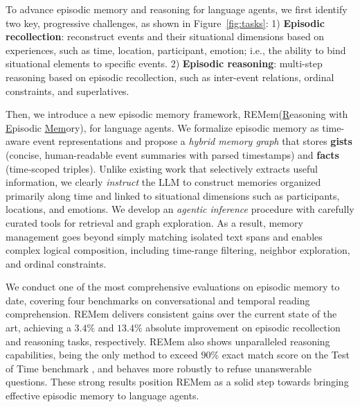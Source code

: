 \documentclass{article} %
\newcommand{\ours}{REMem\xspace}
\begin{document}
To advance episodic memory and reasoning for language agents, we first identify two key, progressive challenges, as shown in Figure~\ref{fig:tasks}:
1) \textbf{Episodic recollection}: reconstruct events and their situational dimensions based on experiences, such as time, location, participant, emotion; i.e., the ability to bind situational elements to specific events.
2) \textbf{Episodic reasoning}: multi-step reasoning based on episodic recollection, such as inter-event relations, ordinal constraints, and superlatives.



Then, we introduce a new episodic memory framework, \ours (\underline{R}easoning with \underline{E}pisodic \underline{Mem}ory), for language agents.
We formalize episodic memory as time-aware event representations and propose a \textit{hybrid memory graph} that stores \textbf{gists} (concise, human-readable event summaries with parsed timestamps) and \textbf{facts} (time-scoped triples). 
Unlike existing work that selectively extracts useful information, we clearly \textit{instruct} the LLM to construct memories organized primarily along time and linked to situational dimensions such as participants, locations, and emotions.
We develop an \textit{agentic inference} procedure with carefully curated tools for retrieval and graph exploration. As a result, memory management goes beyond simply matching isolated text spans and enables complex logical composition, including time-range filtering, neighbor exploration, and ordinal constraints.

We conduct one of the most comprehensive evaluations on episodic memory to date, covering four benchmarks on conversational and temporal reading comprehension. 
\ours delivers consistent gains over the current state of the art, achieving a $3.4\%$ and $13.4\%$ absolute improvement on episodic recollection and reasoning tasks, respectively.
\ours also shows unparalleled reasoning capabilities, being the only method to exceed $90\%$ exact match score on the Test of Time benchmark \citep{tot}, and behaves more robustly to refuse unanswerable questions.
These strong results position \ours as a solid step towards bringing effective episodic memory to language agents.
\end{document}
